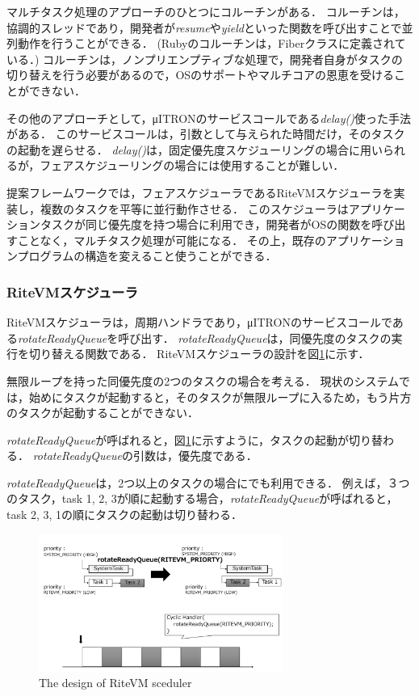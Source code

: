 \documentclass[submit]{ipsj_v2/UTF8/ipsj}
\begin{document}
マルチタスク処理のアプローチのひとつにコルーチンがある．
コルーチンは，協調的スレッドであり，開発者が{\it resume}や{\it yield}といった関数を呼び出すことで並列動作を行うことができる．
(Rubyのコルーチンは，Fiberクラスに定義されている．\cite{url:co-routine})
コルーチンは，ノンプリエンプティブな処理で，開発者自身がタスクの切り替えを行う必要があるので，OSのサポートやマルチコアの恩恵を受けることができない．

その他のアプローチとして，μITRONのサービスコールである{\it delay()}使った手法がある．
このサービスコールは，引数として与えられた時間だけ，そのタスクの起動を遅らせる．
{\it delay()}は，固定優先度スケジューリングの場合に用いられるが，フェアスケジューリングの場合には使用することが難しい．

提案フレームワークでは，フェアスケジューラであるRiteVMスケジューラを実装し，複数のタスクを平等に並行動作させる．
このスケジューラはアプリケーションタスクが同じ優先度を持つ場合に利用でき，開発者がOSの関数を呼び出すことなく，マルチタスク処理が可能になる．
その上，既存のアプリケーションプログラムの構造を変えること使うことができる． 

\subsubsection{RiteVMスケジューラ}
RiteVMスケジューラは，周期ハンドラであり，μITRONのサービスコールである{\it rotateReadyQueue}を呼び出す．
{\it rotateReadyQueue}は，同優先度のタスクの実行を切り替える関数である．
RiteVMスケジューラの設計を図\ref{fig:rotateReadyQueue}に示す．

無限ループを持った同優先度の2つのタスクの場合を考える．
現状のシステムでは，始めにタスクが起動すると，そのタスクが無限ループに入るため，もう片方のタスクが起動することができない．

{\it rotateReadyQueue}が呼ばれると，図\ref{fig:rotateReadyQueue}に示すように，タスクの起動が切り替わる．
{\it rotateReadyQueue}の引数は，優先度である．

{\it rotateReadyQueue}は，2つ以上のタスクの場合にでも利用できる．
例えば，３つのタスク，task 1, 2, 3が順に起動する場合，{\it rotateReadyQueue}が呼ばれると，task 2, 3, 1の順にタスクの起動は切り替わる．

\begin{figure}[t]
    \centering
    \includegraphics[width=8cm,clip]{../EMSOFT2016/figure/rotateReadyQueue.pdf}
    \caption{The design of RiteVM sceduler}
    \label{fig:rotateReadyQueue}
\end{figure} 
 
\end{document}
